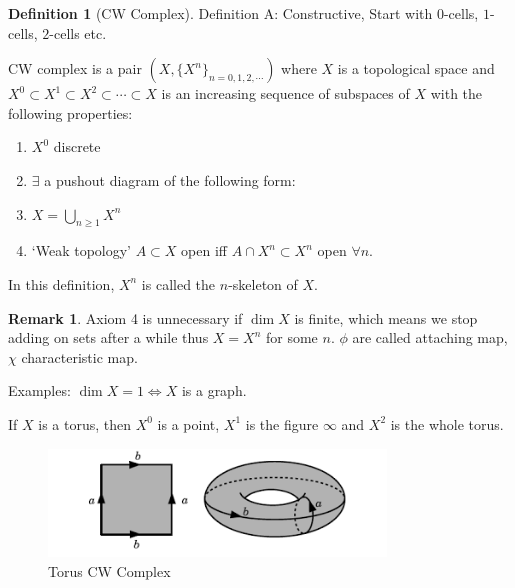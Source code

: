 \documentclass{article}
\theoremstyle{definition}
\newtheorem*{definition}{Definition}
\newtheorem*{remark}{Remark}
\begin{document}
    \begin{definition}
        [CW Complex] 

        Definition A: Constructive, Start with \(0\)-cells, \(1\)-cells, \(2\)-cells etc.

        CW complex is a pair \((X, \{ X^n \}_{n=0,1,2,\cdots})\) where \(X\) is a topological space and \(X^0 \subset X^1 \subset X^2 \subset \cdots \subset X\) is an increasing sequence of subspaces of \(X\) with the following properties:
        
        \begin{enumerate}[label=\arabic*)]
            \item \(X^0\) discrete
            \item \(\exists\) a pushout diagram of the following form:
            
            \begin{center}
            \end{center}

            \item \(X = \bigcup_{n\geq 1} X^n\)
            \item `Weak topology' \(A \subset X\) open iff \(A \cap X^n \subset X^n\) open \(\forall n\). 
        \end{enumerate} 

        In this definition, \(X^n\) is called the \(n\)-skeleton of \(X\).

    \end{definition}

    \begin{remark}
        Axiom 4 is unnecessary if \(\dim X\) is finite, which means we stop adding on sets after a while thus \(X = X^n\) for some \(n\). \(\phi\) are called attaching map, \(\chi\) characteristic map.
    \end{remark}

    Examples: \(\dim X = 1 \iff X\) is a graph.

    If \(X\) is a torus, then \(X^0\) is a point, \(X^1\) is the figure \(\infty\) and \(X^2\) is the whole torus.

    \begin{figure}[H]
        \centering
        \includegraphics[width=0.8\textwidth]{img/toruscw}
        \caption{Torus CW Complex}
        \label{fig:toruscw}
    \end{figure}
\end{document}
